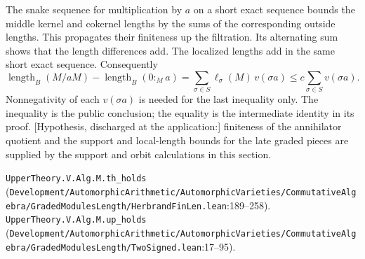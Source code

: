 The snake sequence for multiplication by $a$ on a short exact sequence bounds the middle kernel and cokernel lengths by the sums of the corresponding outside lengths. This propagates their finiteness up the filtration. Its alternating sum shows that the length differences add. The localized lengths add in the same short exact sequence. Consequently
\[
 \operatorname{length}_B(M/aM)-\operatorname{length}_B(0:_Ma)
 =\sum_{\sigma\in S}\ell_\sigma(M)\,v(\sigma a)
 \le c\sum_{\sigma\in S}v(\sigma a).
\]
Nonnegativity of each $v(\sigma a)$ is needed for the last inequality only. The inequality is the public conclusion; the equality is the intermediate identity in its proof. [Hypothesis, discharged at the application:] finiteness of the annihilator quotient and the support and local-length bounds for the late graded pieces are supplied by the support and orbit calculations in this section.

{\footnotesize \nolinkurl{UpperTheory.V.Alg.M.th_holds} (\nolinkurl{Development/AutomorphicArithmetic/AutomorphicVarieties/CommutativeAlgebra/GradedModulesLength/HerbrandFinLen.lean}\allowbreak:189--258). \nolinkurl{UpperTheory.V.Alg.M.up_holds} (\nolinkurl{Development/AutomorphicArithmetic/AutomorphicVarieties/CommutativeAlgebra/GradedModulesLength/TwoSigned.lean}\allowbreak:17--95).}

